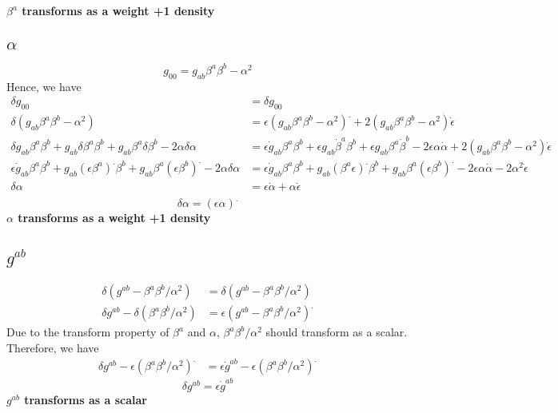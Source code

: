 \documentclass{article}
\begin{document}
{\bf{\color{red}$\beta^{a}$ transforms as a weight +1 density} }
\subsection{$\alpha$}
\[
g_{00} = g_{ab}\beta^{a}\beta^{b}-\alpha^{2}
\]
Hence, we have
\begin{align*}
\delta g_{00} & = \delta g_{00} \\
\delta (g_{ab}\beta^{a}\beta^{b} - \alpha^{2}) & = \epsilon (g_{ab}\beta^{a}\beta^{b} - \alpha^2)^{.} + 2(g_{ab}\beta^{a}\beta^{b} - \alpha^2) {\dot \epsilon}\\
\delta g_{ab} \beta^{a} \beta^{b} + g_{ab} \delta \beta^{a} \beta^{b} + g_{ab} \beta^{a} \delta \beta^{b} - 2\alpha \delta \alpha & = \epsilon {\dot g}_{ab}\beta^{a}\beta^{b} + \epsilon g_{ab} {\dot \beta}^{a} \beta^{b} + \epsilon g_{ab} \beta^{a} {\dot \beta}^{b} - 2\epsilon \alpha {\dot \alpha}  + 2(g_{ab}\beta^{a}\beta^{b} - \alpha^2) {\dot \epsilon}\\
\epsilon {\dot g}_{ab} \beta^{a} \beta^{b} + g_{ab}(\epsilon \beta^{a})^{.}\beta^{b} + g_{ab} \beta^{a} (\epsilon \beta^{b})^{.} - 2\alpha\delta\alpha & = \epsilon {\dot g}_{ab}\beta^{a}\beta^{b} + g_{ab} (\beta^{a} \epsilon)^{.} \beta^{b} + g_{ab} \beta^{a} (\epsilon \beta^{b})^{.} - 2\epsilon \alpha {\dot \alpha}  - 2\alpha^2 {\dot \epsilon}\\
\delta \alpha & = \epsilon {\dot \alpha} + \alpha {\dot \epsilon}\\
\end{align*}
\[
\boxed{
\delta \alpha  = (\epsilon \alpha)^{.}
}
\]
{\bf{\color {red}$\alpha$ transforms as a weight +1 density} }
\subsection{$g^{ab}$}
\begin{align*}
\delta (g^{ab} - \beta^{a}\beta^{b}/\alpha^2) & = \delta (g^{ab} - \beta^{a}\beta^{b}/\alpha^2)\\
\delta g^{ab} - \delta(\beta^{a}\beta^{b}/\alpha^2) & = \epsilon (g^{ab} - \beta^{a}\beta^{b}/\alpha^2)^{.}
\end{align*}
Due to the transform property of $\beta^{a}$ and $\alpha$, $\beta^{a}\beta^{b}/\alpha^2$ should transform as a scalar. Therefore, we have
\begin{align*}
\delta g^{ab} - \epsilon (\beta^{a}\beta^{b}/\alpha^{2})^{.} & = \epsilon {\dot g}^{ab} - \epsilon (\beta^{a}\beta^{b}/\alpha^2)^{.}
\end{align*}
\[
\boxed{
\delta g^{ab} = \epsilon {\dot g^{ab}}
}
\]
{\bf {\color{red} $g^{ab}$ transforms as a scalar}}\\
\end{document}
